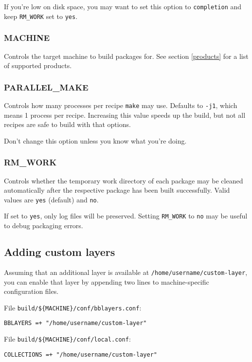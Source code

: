 \documentclass[a4paper]{article}
\newcommand{\shell}[1]{\texttt{\small #1}}
\begin{document}
      If you're low on disk space, you may want to set this option to
      \shell{completion} and keep \shell{RM\_WORK} set to \shell{yes}.

    \subsubsection{MACHINE}
      Controls the target machine to build packages for. See section \ref{products}
      for a list of supported products.

    \subsubsection{PARALLEL\_MAKE}
      Controls how many processes per recipe \shell{make} may use. Defaults to
      \shell{-j1}, which means 1 process per recipe. Increasing this value speeds
      up the build, but not all recipes are safe to build with that options.

      Don't change this option unless you know what you're doing.

    \subsubsection{RM\_WORK}
      Controls whether the temporary work directory of each package may be
      cleaned automatically after the respective package has been built
      successfully. Valid values are \shell{yes} (default) and \shell{no}.

      If set to \shell{yes}, only log files will be preserved. Setting
      \shell{RM\_WORK} to \shell{no} may be useful to debug packaging errors.

  \subsection{Adding custom layers}
  \label{custom_layers}
     Assuming that an additional layer is available at \shell{/home/username/custom-layer},
     you can enable that layer by appending two lines to machine-specific configuration
     files.

     File \shell{build/\$\{MACHINE\}/conf/bblayers.conf}:

     \shell{BBLAYERS =+ "/home/username/custom-layer"}

     File \shell{build/\$\{MACHINE\}/conf/local.conf}:

     \shell{COLLECTIONS =+ "/home/username/custom-layer"}
\end{document}
